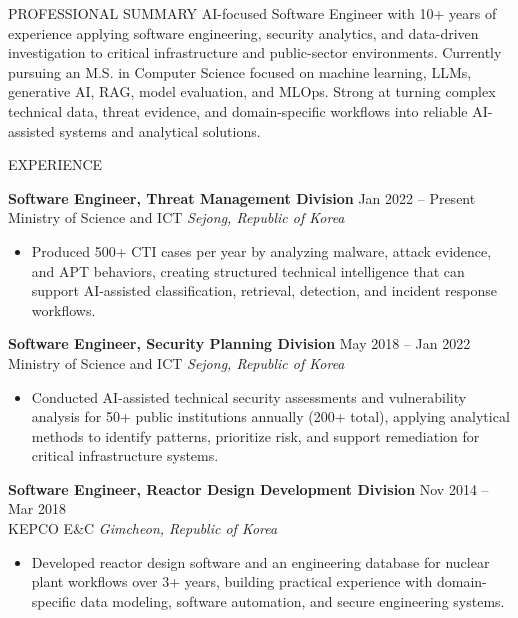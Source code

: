 \documentclass{resume}
\begin{document}
\small

\begin{rSection}{PROFESSIONAL SUMMARY}
AI-focused Software Engineer with 10+ years of experience applying software engineering, security analytics, and data-driven investigation to critical infrastructure and public-sector environments. Currently pursuing an M.S. in Computer Science focused on machine learning, LLMs, generative AI, RAG, model evaluation, and MLOps. Strong at turning complex technical data, threat evidence, and domain-specific workflows into reliable AI-assisted systems and analytical solutions.
\end{rSection}

\begin{rSection}{EXPERIENCE}

\textbf{Software Engineer, Threat Management Division} \hfill Jan 2022 -- Present\\
Ministry of Science and ICT \hfill \textit{Sejong, Republic of Korea}
\begin{itemize}
    \itemsep -4pt {}
    \item Produced 500+ CTI cases per year by analyzing malware, attack evidence, and APT behaviors, creating structured technical intelligence that can support AI-assisted classification, retrieval, detection, and incident response workflows.
\end{itemize}

\textbf{Software Engineer, Security Planning Division} \hfill May 2018 -- Jan 2022\\
Ministry of Science and ICT \hfill \textit{Sejong, Republic of Korea}
\begin{itemize}
    \itemsep -4pt {}
    \item Conducted AI-assisted technical security assessments and vulnerability analysis for 50+ public institutions annually (200+ total), applying analytical methods to identify patterns, prioritize risk, and support remediation for critical infrastructure systems.
\end{itemize}

\textbf{Software Engineer, Reactor Design Development Division} \hfill Nov 2014 -- Mar 2018\\
KEPCO E\&C \hfill \textit{Gimcheon, Republic of Korea}
\begin{itemize}
    \itemsep -4pt {}
    \item Developed reactor design software and an engineering database for nuclear plant workflows over 3+ years, building practical experience with domain-specific data modeling, software automation, and secure engineering systems.
\end{itemize}

\end{rSection}
\end{document}
